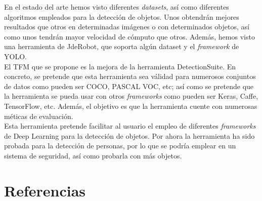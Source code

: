 \documentclass{bmvc2k}
\begin{document}
En el estado del arte hemos visto diferentes \textit{datasets}, así como diferentes algoritmos empleados para la detección de objetos. Unos obtendrán mejores resultados que otros en determinadas imágenes o con determinados objetos, así como unos tendrán mayor velocidad de cómputo que otros. Además, hemos visto una herramienta de JdeRobot, que soporta algún dataset y el \textit{framework} de YOLO.\\

El TFM que se propone es la mejora de la herramienta DetectionSuite. En concreto, se pretende que esta herramienta sea válidad para numerosos conjuntos de datos como pueden ser COCO, PASCAL VOC, etc; así como se pretende que la herramienta se pueda usar con otros \textit{frameworks} como pueden ser Keras, Caffe, TensorFlow, etc. Además, el objetivo es que la herramienta cuente con numerosas méticas de evaluación.\\

Esta herramienta pretende facilitar al usuario el empleo de diferentes \textit{frameworks} de Deep Learning para la detección de objetos. Por ahora la herramienta ha sido probada para la detección de personas, por lo que se podría emplear en un sistema de seguridad, así como probarla con más objetos.\\



\section{Referencias}


\end{document}
